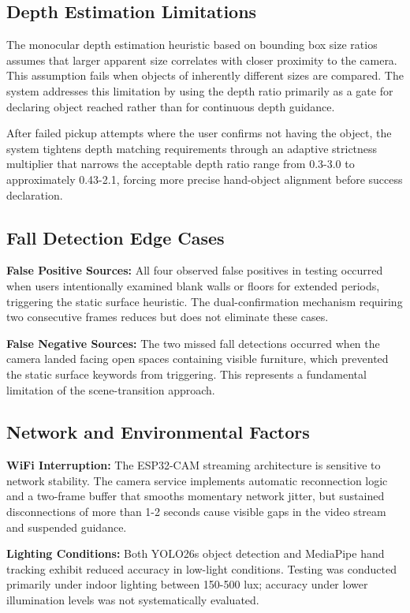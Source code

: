 \documentclass[12pt,a4paper]{report}
\begin{document}
\subsection{Depth Estimation Limitations}

The monocular depth estimation heuristic based on bounding box size ratios assumes that larger apparent size correlates with closer proximity to the camera. This assumption fails when objects of inherently different sizes are compared. The system addresses this limitation by using the depth ratio primarily as a gate for declaring object reached rather than for continuous depth guidance.

After failed pickup attempts where the user confirms not having the object, the system tightens depth matching requirements through an adaptive strictness multiplier that narrows the acceptable depth ratio range from 0.3-3.0 to approximately 0.43-2.1, forcing more precise hand-object alignment before success declaration.

\subsection{Fall Detection Edge Cases}

\textbf{False Positive Sources:} All four observed false positives in testing occurred when users intentionally examined blank walls or floors for extended periods, triggering the static surface heuristic. The dual-confirmation mechanism requiring two consecutive frames reduces but does not eliminate these cases.

\textbf{False Negative Sources:} The two missed fall detections occurred when the camera landed facing open spaces containing visible furniture, which prevented the static surface keywords from triggering. This represents a fundamental limitation of the scene-transition approach.

\subsection{Network and Environmental Factors}

\textbf{WiFi Interruption:} The ESP32-CAM streaming architecture is sensitive to network stability. The camera service implements automatic reconnection logic and a two-frame buffer that smooths momentary network jitter, but sustained disconnections of more than 1-2 seconds cause visible gaps in the video stream and suspended guidance.

\textbf{Lighting Conditions:} Both YOLO26s object detection and MediaPipe hand tracking exhibit reduced accuracy in low-light conditions. Testing was conducted primarily under indoor lighting between 150-500 lux; accuracy under lower illumination levels was not systematically evaluated.
\end{document}
